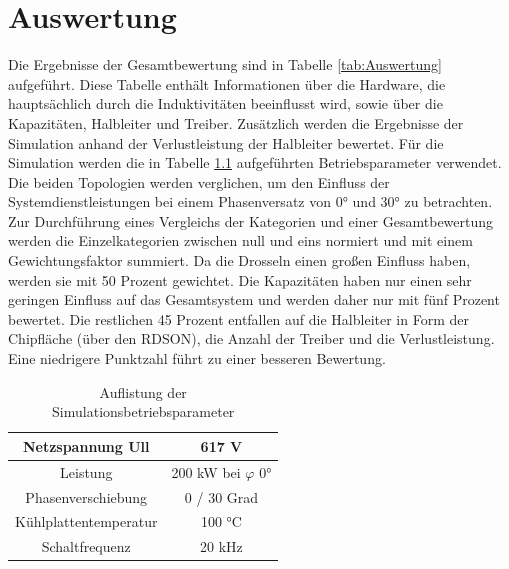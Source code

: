 \chapter{Auswertung}
Die Ergebnisse der Gesamtbewertung sind in Tabelle \ref{tab:Auswertung} aufgeführt. Diese Tabelle enthält Informationen über die Hardware, die hauptsächlich durch die Induktivitäten beeinflusst wird, sowie über die Kapazitäten, Halbleiter und Treiber. Zusätzlich werden die Ergebnisse der Simulation anhand der Verlustleistung der Halbleiter bewertet. Für die Simulation werden die in Tabelle \ref{tab:Betriebspara} aufgeführten Betriebsparameter verwendet. Die beiden Topologien werden verglichen, um den Einfluss der Systemdienstleistungen bei einem Phasenversatz von 0° und 30° zu betrachten. Zur Durchführung eines Vergleichs der Kategorien und einer Gesamtbewertung werden die Einzelkategorien zwischen null und eins normiert und mit einem Gewichtungsfaktor summiert. Da die Drosseln einen großen Einfluss haben, werden sie mit 50 Prozent gewichtet. Die Kapazitäten haben nur einen sehr geringen Einfluss auf das Gesamtsystem und werden daher nur mit fünf Prozent bewertet. Die restlichen 45 Prozent entfallen auf die Halbleiter in Form der Chipfläche (über den RDSON), die Anzahl der Treiber und die Verlustleistung. Eine niedrigere Punktzahl führt zu einer besseren Bewertung. \\

\begin{table}
	\centering
\begin{tabular}{|c|c|}
	\hline
	Netzspannung \gls{Ull} & 617 \si{\volt} \\
	\hline
	Leistung & 200 kW bei $\varphi$ 0° \\
	\hline
	Phasenverschiebung & 0 / 30 Grad \\
	\hline
	Kühlplattentemperatur & 100 °C \\
	\hline
	Schaltfrequenz & 20 kHz \\
	\hline
\end{tabular}
\caption{Auflistung der Simulationsbetriebsparameter}
\label{tab:Betriebspara}
\end{table}


